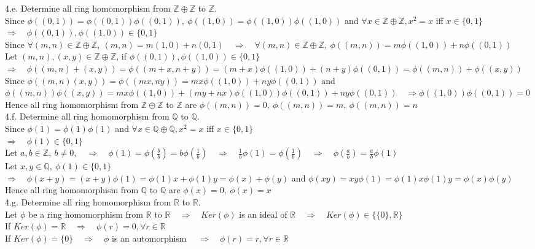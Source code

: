\documentclass[12pt]{book}
\begin{document}
\begin{CJK}{UTF8}{bsmi}
4.e. Determine all ring homomorphism from $\mathbb{Z}\oplus\mathbb{Z}$ to $\mathbb{Z}$. \\
Since $\phi((0, 1))=\phi((0, 1))\phi((0, 1)),\ \phi((1, 0))=\phi((1, 0))\phi((1, 0))$ and $\forall x\in\mathbb{Z}\oplus\mathbb{Z}, x^2=x$ iff $x\in\{0, 1\}$ \\
$\Rightarrow\quad\phi((0, 1)), \phi((1, 0))\in\{0, 1\}$ \\
Since $\forall (m, n)\in\mathbb{Z}\oplus\mathbb{Z},\ (m, n)=m(1, 0)+n(0, 1)\quad\Rightarrow\quad\forall (m, n)\in\mathbb{Z}\oplus\mathbb{Z},\ \phi((m, n))=m\phi((1, 0))+n\phi((0, 1))$ \\
Let $(m, n), (x, y)\in\mathbb{Z}\oplus\mathbb{Z}$, if $\phi((0, 1)), \phi((1, 0))\in\{0, 1\}$ \\
$\Rightarrow\quad\phi((m, n)+(x, y))=\phi((m+x, n+y))=(m+x)\phi((1, 0))+(n+y)\phi((0, 1))=\phi((m, n))+\phi((x, y))$ \\
Since $\phi((m, n)(x, y))=\phi((mx, ny))=mx\phi((1, 0))+ny\phi((0, 1))$ and \\
$\phi((m, n))\phi((x, y))=mx\phi((1, 0))+(my+nx)\phi((1, 0))\phi((0, 1))+ny\phi((0, 1))\quad\Rightarrow\phi((1, 0))\phi((0, 1))=0$ \\
Hence all ring homomorphism from $\mathbb{Z}\oplus\mathbb{Z}$ to $\mathbb{Z}$ are $\phi((m, n))=0,\ \phi((m, n))=m,\ \phi((m, n))=n$ \\

4.f. Determine all ring homomorphism from $\mathbb{Q}$ to $\mathbb{Q}$. \\
Since $\phi(1)=\phi(1)\phi(1)$ and $\forall x\in\mathbb{Q}\oplus\mathbb{Q}, x^2=x$ iff $x\in\{0, 1\}$ \\
$\Rightarrow\quad\phi(1)\in\{0, 1\}$ \\
Let $\displaystyle a, b\in\mathbb{Z},\ b\ne0,\quad\Rightarrow\quad\phi(1)=\phi(\frac{b}{b})=b\phi(\frac{1}{b})\quad\Rightarrow\quad\frac{1}{b}\phi(1)=\phi(\frac{1}{b})\quad\Rightarrow\quad\phi(\frac{a}{b})=\frac{a}{b}\phi(1)$ \\
Let $x, y\in\mathbb{Q},\ \phi(1)\in\{0, 1\}$ \\
$\Rightarrow\quad\phi(x+y)=(x+y)\phi(1)=\phi(1)x+\phi(1)y=\phi(x)+\phi(y)$ and $\phi(xy)=xy\phi(1)=\phi(1)x\phi(1)y=\phi(x)\phi(y)$ \\
Hence all ring homomorphism from $\mathbb{Q}$ to $\mathbb{Q}$ are $\phi(x)=0,\ \phi(x)=x$ \\

4.g. Determine all ring homomorphism from $\mathbb{R}$ to $\mathbb{R}$. \\
Let $\phi$ be a ring homomorphism from $\mathbb{R}$ to $\mathbb{R}\quad\Rightarrow\quad Ker(\phi)$ is an ideal of $\mathbb{R}\quad\Rightarrow\quad Ker(\phi)\in\{\{0\}, \mathbb{R}\}$ \\
If $Ker(\phi)=\mathbb{R}\quad\Rightarrow\quad\phi(r)=0, \forall r\in\mathbb{R}$ \\
If $Ker(\phi)=\{0\}\quad\Rightarrow\quad\phi$ is an automorphism $\quad\Rightarrow\quad\phi(r)=r, \forall r\in\mathbb{R}$ \\


\end{CJK}
\end{document}
